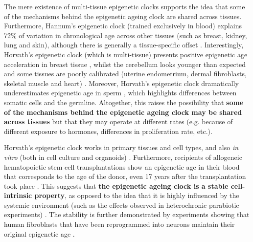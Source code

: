 \bigskip

The mere existence of multi-tissue epigenetic clocks supports the idea that some of the mechanisms behind the epigenetic ageing clock are shared across tissues. Furthermore, Hannum's epigenetic clock (trained exclusively in blood) explains 72\% of variation in chronological age across other tissues (such as breast, kidney, lung and skin), although there is generally a tissue-specific offset \cite{Hannum2013}. Interestingly, Horvath's epigenetic clock (which is multi-tissue) presents positive epigenetic age acceleration in breast tissue \cite{Sehl2017}, whilst the cerebellum looks younger than expected \cite{Horvath2015} and some tissues are poorly calibrated (uterine endometrium, dermal fibroblasts, skeletal muscle and heart) \cite{Horvath2013}. Moreover, Horvath's epigenetic clock dramatically underestimates epigenetic age in sperm \cite{Horvath2013}, which highlights differences between somatic cells and the germline. Altogether, this raises the possibility that \textbf{some of the mechanisms behind the epigenetic ageing clock may be shared across tissues} but that they may operate at different rates (e.g. because of different exposure to hormones, differences in proliferation rate, etc.). 

\bigskip

Horvath's epigenetic clock works in primary tissues and cell types, and also \textit{in vitro} (both in cell culture and organoids) \cite{Horvath2013,Hoshino2019}. Furthermore, recipients of allogeneic hematopoietic stem cell transplantations show an epigenetic age in their blood that corresponds to the age of the donor, even 17 years after the transplantation took place \cite{Soraas2019}. This suggests that \textbf{the epigenetic ageing clock is a stable cell-intrinsic property}, as opposed to the idea that it is highly influenced by the systemic environment (such as the effects observed in heterochronic parabiotic experiments) \cite{Conboy2005}. The stability is further demonstrated by experiments showing that human fibroblasts that have been reprogrammed into neurons maintain their original epigenetic age \cite{Huh2016}.     

\bigskip

